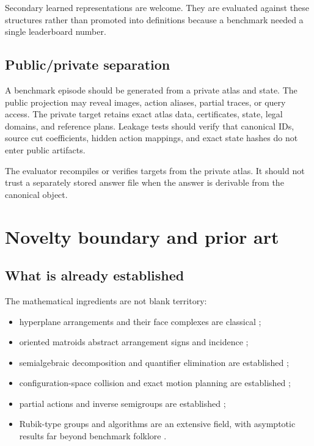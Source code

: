 \documentclass[11pt,openany]{book}
\theoremstyle{polyplain}
\theoremstyle{polydef}
\begin{document}
Secondary learned representations are welcome. They are evaluated against these structures rather than promoted into definitions because a benchmark needed a single leaderboard number.

\section{Public/private separation}

A benchmark episode should be generated from a private atlas and state. The public projection may reveal images, action aliases, partial traces, or query access. The private target retains exact atlas data, certificates, state, legal domains, and reference plans. Leakage tests should verify that canonical IDs, source cut coefficients, hidden action mappings, and exact state hashes do not enter public artifacts.

The evaluator recompiles or verifies targets from the private atlas. It should not trust a separately stored answer file when the answer is derivable from the canonical object.

\chapter{Novelty boundary and prior art}
\label{chap:novelty}

\section{What is already established}
\label{sec:novelty-boundary}

The mathematical ingredients are not blank territory:
\begin{itemize}
  \item hyperplane arrangements and their face complexes are classical \parencite{Zaslavsky1975,EdelsbrunnerORourkeSeidel1986};
  \item oriented matroids abstract arrangement signs and incidence \parencite{FolkmanLawrence1978};
  \item semialgebraic decomposition and quantifier elimination are established \parencite{Collins1975,BasuPollackRoy2006};
  \item configuration-space collision and exact motion planning are established \parencite{LozanoPerez1983,SchwartzSharir1983I,SchwartzSharir1983II};
  \item partial actions and inverse semigroups are established \parencite{Exel1998,KellendonkLawson2004};
  \item Rubik-type groups and algorithms are an extensive field, with asymptotic results far beyond benchmark folklore \parencite{DemaineEtAl2011}.
\end{itemize}
\end{document}

